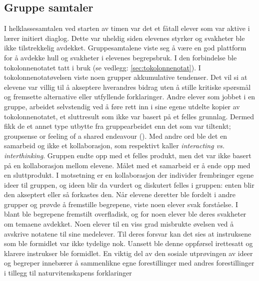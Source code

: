 \documentclass[main.tex]{subfiles}
\begin{document}
\subsection*{Gruppe samtaler}
I helklassesamtalen ved starten av timen var det et fåtall elever som var aktive i lærer initiert 
diaglog. Dette var uheldig siden elevenes styrker og svakheter ble ikke tilstrekkelig avdekket. 
Gruppesamtalene viste seg å være en god plattform for å avdekke hull og svakheter i elevenes 
begrepsbruk. I den forbindelse ble tokolonnenotatet tatt i bruk (se vedlegg: 
\ref{sec:tokolonnenotat}).
\newline
\newline
I tokolonnenotatøvelsen viste noen grupper akkumulative tendenser. Det vil si at elevene 
var villig til å akseptere hverandres bidrag uten å stille kritiske spørsmål og fremsette
alternative eller utfyllende forklaringer. Andre elever som jobbet i en gruppe, arbeidet 
selvstendig ved å føre rett inn i sine egene utdelte kopier av tokolonnenotatet, et sluttresult som 
ikke var basert på et felles grunnlag. Dermed fikk de et annet type utbytte fra gruppearbeidet
enn det som var tiltenkt; \guillemotleft groupsense or feeling of a shared endeavour
\guillemotright (). Med andre ord ble det en samarbeid og ikke 
et kollaborasjon, som  respektivt kaller \emph{interacting vs. interthinking}. 
Gruppen endte opp med et felles produkt, men det var ikke basert på en kollaborasjon mellom elevene. 
Målet med et samarbeid er å ende opp med en sluttprodukt. I motsetning er en kollaborasjon der 
individer frembringer egene ideer til gruppen, og ideen blir da vurdert og diskutert felles i 
gruppen: enten blir den akseptert eller så forkastes den.
\newline
\newline
Når elevene deretter ble fordelt i andre grupper og prøvde å fremstille begrepene, viste noen elever 
svak forståelse. I blant ble begrepene fremstilt overfladisk, og for noen elever ble deres svakheter 
om temaene avdekket. Noen elever til en viss grad misbrukte øvelsen ved å avskrive notatene til sine 
medelever. Til deres forsvar kan det sies at instruksene som ble formidlet var ikke tydelige nok. 
Uansett ble denne oppførsel irettesatt og klarere instrukser ble formidlet.
\newline
\newline
En viktig del av den sosiale utprøvingen av ideer og begreper innebærer å sammenlikne egne 
forestillinger med andres forestillinger i tillegg til naturvitenskapens forklaringer 
\end{document}
